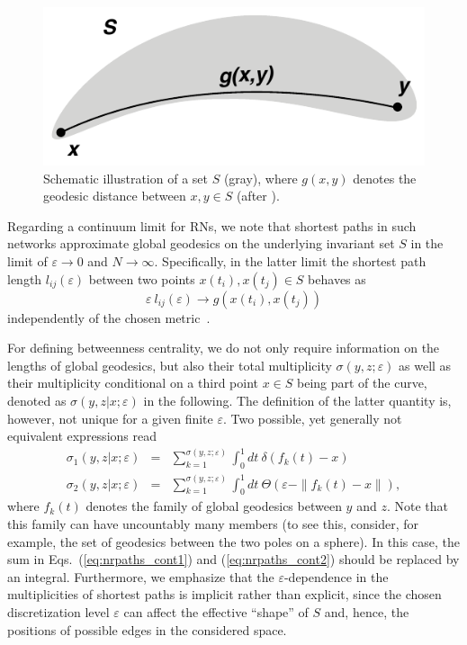 \documentclass[graybox]{svmult}
\begin{document}
\begin{figure}
\centering
\includegraphics[width=.50\columnwidth]{fig1.pdf} 
\caption{Schematic illustration of a set $S$ (gray), where $g(x,y)$ denotes the geodesic distance between $x,y\in S$ (after \cite{Donges2012PRE}).}
\label{fig:manifold}
\end{figure}

Regarding a continuum limit for RNs, we note that shortest paths in such networks approximate global geodesics on the underlying invariant set $S$ in the limit of $\varepsilon\to 0$ and $N\to\infty$. Specifically, in the latter limit the shortest path length $l_{ij}(\varepsilon)$ between two points $x(t_i), x(t_j)\in S$ behaves as
\begin{equation}
\varepsilon\ l_{ij}(\varepsilon) \to g(x(t_i),x(t_j))
\end{equation}
\noindent 
independently of the chosen metric~\cite{Donges2012PRE}.

For defining betweenness centrality, we do not only require information on the lengths of global geodesics, but also their total multiplicity $\sigma(y,z;\varepsilon)$ as well as their multiplicity conditional on a third point $x\in S$ being part of the curve, denoted as $\sigma(y,z|x;\varepsilon)$ in the following. The definition of the latter quantity is, however, not unique for a given finite $\varepsilon$. Two possible, yet generally not equivalent expressions read~\cite{Donges2012PRE}
\begin{eqnarray}
\sigma_1(y,z|x;\varepsilon) &=& \sum_{k=1}^{\sigma(y,z;\varepsilon)} \int_0^1 dt\ \delta(f_k(t)-x) \label{eq:nrpaths_cont1} \\
\sigma_2(y,z|x;\varepsilon) &=& \sum_{k=1}^{\sigma(y,z;\varepsilon)} \int_0^1 dt\ \Theta(\varepsilon-\|f_k(t)-x\|), \label{eq:nrpaths_cont2}
\end{eqnarray}
\noindent
where $f_k(t)$ denotes the family of global geodesics between $y$ and $z$. Note that this family can have uncountably many members (to see this, consider, for example, the set of geodesics between the two poles on a sphere). In this case, the sum in Eqs.~(\ref{eq:nrpaths_cont1}) and (\ref{eq:nrpaths_cont2}) should be replaced by an integral. Furthermore, we emphasize that the $\varepsilon$-dependence in the multiplicities of shortest paths is implicit rather than explicit, since the chosen discretization level $\varepsilon$ can affect the effective ``shape'' of $S$ and, hence, the positions of possible edges in the considered space.
\end{document}
